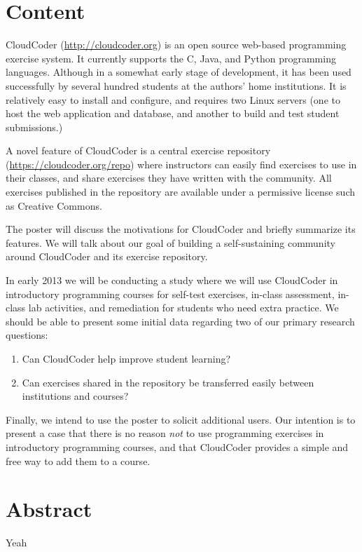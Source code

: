\documentclass[11pt]{article}
\begin{document}
\section*{Content}

CloudCoder (\url{http://cloudcoder.org}) is an open source web-based
programming exercise system.  It currently supports the C, Java, and
Python programming languages.  Although in a somewhat early stage of
development, it has been used successfully by several hundred students
at the authors' home institutions.  It is relatively easy to
install and configure, and requires two Linux servers
(one to host the web application and database, and another to build
and test student submissions.)

A novel feature of CloudCoder is a central exercise repository
(\url{https://cloudcoder.org/repo}) where
instructors can easily find exercises to use in their classes,
and share exercises they have written with the community.  All exercises
published in the repository are available under a permissive license
such as Creative Commons.

The poster will discuss the motivations for CloudCoder and briefly summarize
its features.  We will talk about our goal of building a self-sustaining
community around CloudCoder and its exercise repository.

In early 2013 we will be conducting a study where we will use CloudCoder
in introductory programming courses for self-test exercises, in-class
assessment, in-class lab activities, and remediation for students who need
extra practice.  We should be able to present some initial data regarding
two of our primary research questions:

\begin{enumerate}
\item Can CloudCoder help improve student learning?
\item Can exercises shared in the repository be transferred
      easily between institutions and courses?
\end{enumerate}

Finally, we intend to use the poster to solicit additional users.
Our intention is to present a case that there is no reason {\em not}
to use programming exercises in introductory programming courses,
and that CloudCoder provides a simple and free way to add them
to a course.

\section*{Abstract}

Yeah
\end{document}

